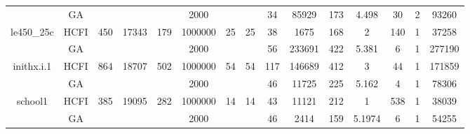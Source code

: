 \documentclass[10pt]{article}
\begin{document}
\begin{center}
\begin{table}[H]
\begin{tabular}{|c|c|c|c|c|c|c|c|c|c|c|c|c|c|c|}
	&GA&       &                   &                     &    2000     &     \cellcolor{yellow} & {\cellcolor{yellow}}& {{\cellcolor{green}34}}
&85929   &173        &4.498                   & 30                   &2          &93260        \\ \cline{2-2} \cline{6-6} \cline{9-15}
 \multirow{-2}{*}{le450\_25c} &HCFI   &\multirow{-2}{*}{450}   &\multirow{-2}{*}{17343}     &\multirow{-2}{*}{179}     &1000000     &\multirow{-2}{*}{\cellcolor{yellow}25}      & \multirow{-2}{*}{\cellcolor{yellow}25}    &{\cellcolor{green}38}     &1675         &168    &2         &140    & 1    & 37258       \\ \hline \hline
	&GA&       &                   &                     &   2000      &     \cellcolor{yellow} & {\cellcolor{yellow}}& {{\cellcolor{green}56}}
&233691   &422        &5.381                   &6                    &1          & 277190        \\ \cline{2-2} \cline{6-6} \cline{9-15}
 \multirow{-2}{*}{inithx.i.1} &HCFI   &\multirow{-2}{*}{864}   &\multirow{-2}{*}{18707}     &\multirow{-2}{*}{502}     &1000000     &\multirow{-2}{*}{\cellcolor{yellow}54}      & \multirow{-2}{*}{\cellcolor{yellow}54}    &{\cellcolor{green}117}     &146689         &412    &3         &44    & 1    &171859        \\ \hline \hline
	&GA&       &                   &                     &    2000     &     \cellcolor{yellow} & {\cellcolor{yellow}}& {{\cellcolor{green}46}}
&11725   &225        &5.162                   &4                    &1          &78306         \\ \cline{2-2} \cline{6-6} \cline{9-15}
 \multirow{-2}{*}{school1} &HCFI   &\multirow{-2}{*}{385}   &\multirow{-2}{*}{19095}     &\multirow{-2}{*}{282}     &1000000     &\multirow{-2}{*}{\cellcolor{yellow}14}      & \multirow{-2}{*}{\cellcolor{yellow}14}    &{\cellcolor{green}43}     &11121         &212    &1         &538    &1     &38039       \\ \hline \hline
	&GA&       &                   &                     &    2000     &     \cellcolor{yellow} & {\cellcolor{yellow}}& {{\cellcolor{green}46}}
&2414   &159        &5.1974                   &6                    &1          &54255        \\ \cline{2-2} \cline{6-6} \cline{9-15}

\end{tabular}
\end{table}
\end{center}
\end{document}
